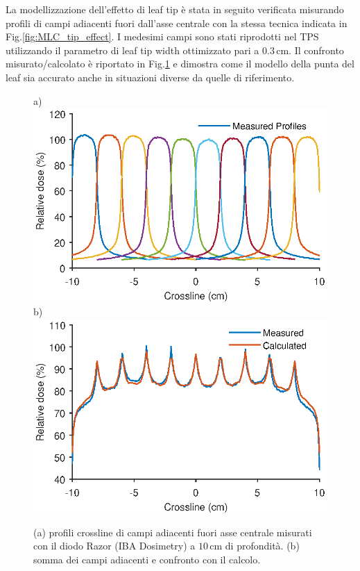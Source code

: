 La modellizzazione dell'effetto di leaf tip è stata in seguito verificata misurando profili di campi adiacenti fuori dall'asse centrale con la stessa tecnica indicata in Fig.\ref{fig:MLC_tip_effect}. I medesimi campi sono stati riprodotti nel TPS utilizzando il parametro di leaf tip width ottimizzato pari a $0.3\,$cm. Il confronto misurato/calcolato è riportato in Fig.\ref{fig:MLC_tip_model_offaxis} e dimostra come il modello della punta del leaf sia accurato anche in situazioni diverse da quelle di riferimento.
\begin{figure}
\centering
a)\includegraphics[width=.7\textwidth]{./cap2/MLC_Plots/Abutted/PlotMLC_Tip_modeling_offaxis.eps}
b)\includegraphics[width=.7\textwidth]{./cap2/MLC_Plots/Abutted/PlotMLC_Tip_modeling_offaxisSUM.eps}
\caption{(a) profili crossline di campi adiacenti fuori asse centrale misurati con il diodo Razor (IBA Dosimetry) a $10\,$cm di profondità. (b) somma dei campi adiacenti e confronto con il calcolo.}
\label{fig:MLC_tip_model_offaxis}
\end{figure}


